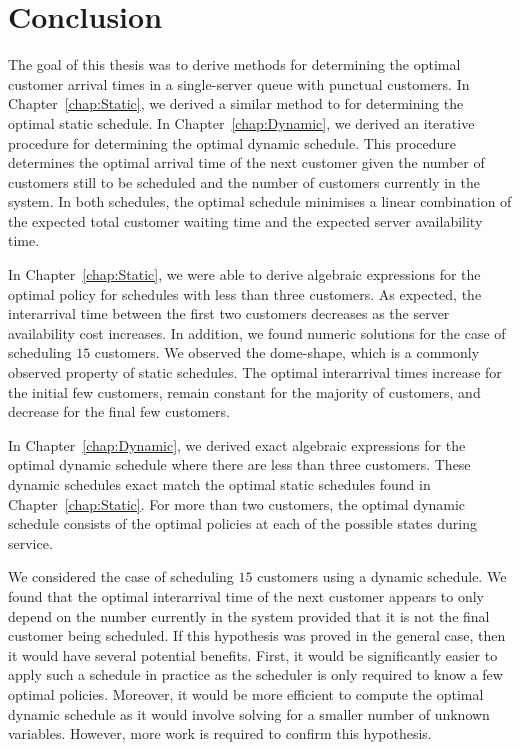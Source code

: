 \chapter{Conclusion}
The goal of this thesis was to derive methods for determining the optimal customer arrival times in a single-server queue with punctual customers. In Chapter~\ref{chap:Static}, we derived a similar method to \citet{Pegden} for determining the optimal static schedule. In Chapter~\ref{chap:Dynamic}, we derived an iterative procedure for determining the optimal dynamic schedule. This procedure determines the optimal arrival time of the next customer given the number of customers still to be scheduled and the number of customers currently in the system. In both schedules, the optimal schedule minimises a linear combination of the expected total customer waiting time and the expected server availability time.

In Chapter~\ref{chap:Static}, we were able to derive algebraic expressions for the optimal policy for schedules with less than three customers. As expected, the interarrival time between the first two customers decreases as the server availability cost increases. In addition, we found numeric solutions for the case of scheduling $15$ customers. We observed the dome-shape, which is a commonly observed property of static schedules. The optimal interarrival times increase for the initial few customers, remain constant for the majority of customers, and decrease for the final few customers.

In Chapter~\ref{chap:Dynamic}, we derived exact algebraic expressions for the optimal dynamic schedule where there are less than three customers. These dynamic schedules exact match the optimal static schedules found in Chapter~\ref{chap:Static}. For more than two customers, the optimal dynamic schedule consists of the optimal policies at each of the possible states during service.

We considered the case of scheduling $15$ customers using a dynamic schedule. We found that the optimal interarrival time of the next customer appears to only depend on the number currently in the system provided that it is not the final customer being scheduled. If this hypothesis was proved in the general case, then it would have several potential benefits. First, it would be significantly easier to apply such a schedule in practice as the scheduler is only required to know a few optimal policies. Moreover, it would be more efficient to compute the optimal dynamic schedule as it would involve solving for a smaller number of unknown variables. However, more work is required to confirm this hypothesis.

